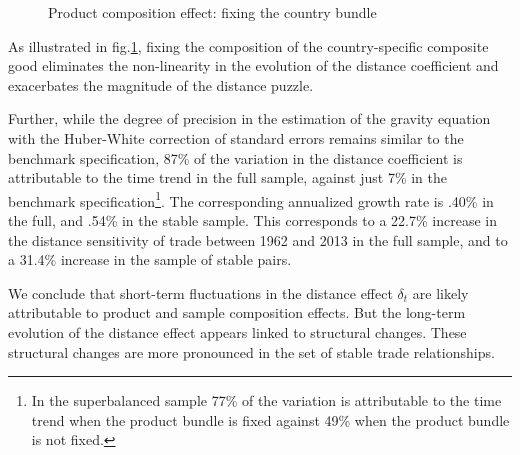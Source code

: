 \documentclass[12pt,twoside,a4paper,notitlepage]{article}
\begin{document}
\begin{figure}[h!]
\caption{Product composition effect: fixing the country bundle  \label{fig:compbundle}}
\begin{center}
\setlength{\fboxrule}{1pt} %
\setlength{\fboxsep}{.1in} %
\end{center}
\end{figure}

As illustrated in fig.\ref{fig:compbundle}, fixing the composition of the country-specific composite good  eliminates the non-linearity in the evolution of the distance coefficient and \fi
exacerbates the magnitude of the distance puzzle.

Further, while the degree of precision in the estimation of the gravity equation with the Huber-White correction of standard errors remains similar to the benchmark specification, 87\% of the variation in the distance coefficient is attributable to the time trend in the full sample, against just 7\% in the benchmark specification\footnote{In the superbalanced sample 77\% of the variation is attributable to the time trend when the product bundle is fixed against 49\% when the product bundle is not fixed.}.
The corresponding annualized growth rate is .40\% in the full, and .54\% in the stable sample.
This corresponds to a 22.7\% increase in the distance sensitivity of trade between 1962 and 2013 in the full sample, and to a 31.4\% increase in the sample of stable pairs.

We conclude that short-term fluctuations in the distance effect $\delta_t$ are likely attributable to product and sample composition effects.
But the long-term evolution of the distance effect appears linked to structural changes.
These structural changes are more pronounced in the set of stable trade relationships.

\end{document}
